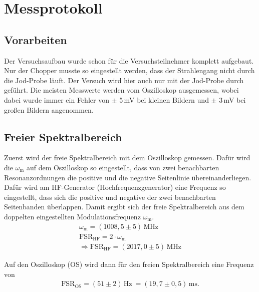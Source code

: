 
\def\skalierung{0.65}

\chapter{Messprotokoll}
\label{chap:protokoll}

\section{Vorarbeiten}
\label{sec:vorarbeit}

Der Versuchsaufbau wurde schon für die Versuchsteilnehmer komplett aufgebaut. Nur der Chopper musste so eingestellt werden, dass der Strahlengang nicht durch die Jod-Probe läuft. Der Versuch wird hier auch nur mit der Jod-Probe durch geführt. Die meisten Messwerte werden vom Oszilloskop ausgemessen, wobei dabei wurde immer ein Fehler von $\pm$ 5\,mV bei kleinen Bildern und $\pm$ 3\,mV bei großen Bildern angenommen.

\section{Freier Spektralbereich}
\label{sec:specBereich}

Zuerst wird der freie Spektralbereich mit dem Oszilloskop gemessen. Dafür wird die $\omega_\mathrm{m}$ auf dem Oszilloskop so eingestellt, dass von zwei benachbarten Resonanzordnungen die positive und die negative Seitenlinie übereinanderliegen. Dafür wird am HF-Generator (Hochfrequenzgenerator) eine Frequenz so eingestellt, dass sich die positive und negative der zwei benachbarten Seitenbanden überlappen. Damit ergibt sich der freie Spektralbereich aus dem doppelten eingestellten Modulationsfrequenz $\omega_\mathrm{m}$. 
\begin{gather}
    \omega_\mathrm{m} = ( 1008,5 \pm 5 )\,\mathrm{MHz} \\
    \mathrm{FSR}_\mathrm{HF} = 2 \cdot \omega_\mathrm{m} \\
    \Rightarrow \boxed{\mathrm{FSR}_\mathrm{HF} = ( 2017,0 \pm 5 )\,\mathrm{MHz}}
\end{gather}

Auf den Oszilloskop (OS) wird dann für den freien Spektralbereich eine Frequenz von 
\begin{gather}
    \boxed{\mathrm{FSR}_\mathrm{OS} = (51 \pm 2)\,\mathrm{Hz}~ = (19,7 \pm 0,5)\,\mathrm{ms}.}
\end{gather}

